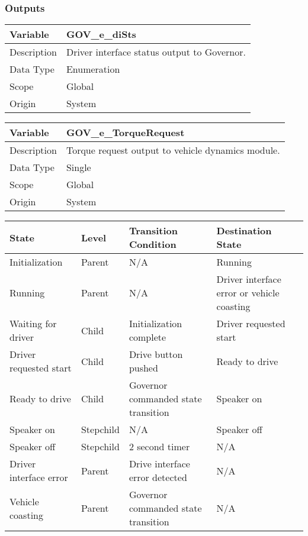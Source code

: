 \documentclass[12pt, titlepage]{article}
\newcommand{\tableVspace}{5mm}
\newcommand{\ReqColA}{0.13\textwidth}
\newcommand{\ReqColB}{0.82\textwidth}
\begin{document}
\subsubsection{Outputs}

\vspace{\tableVspace}\noindent
\begin{tabular}{| p{\ReqColA} | p{\ReqColB}|}
\hline
\rowcolor[gray]{0.9}
\hline
Variable & GOV\_e\_diSts \\
\hline
Description & Driver interface status output to Governor.\\
\hline
Data Type & Enumeration\\
\hline
Scope & Global \\
\hline
Origin & System \\
\hline
\end{tabular}

\vspace{\tableVspace}\noindent
\begin{tabular}{| p{\ReqColA} | p{\ReqColB}|}
\hline
\rowcolor[gray]{0.9}
\hline
Variable & GOV\_e\_TorqueRequest \\
\hline
Description & Torque request output to vehicle dynamics module.\\
\hline
Data Type & Single\\
\hline
Scope & Global \\
\hline
Origin & System \\
\hline
\end{tabular}

\vspace{\tableVspace}\noindent
\begin{tabular}{| p{} | p{} | p{} | p{} | }
\hline
\rowcolor[gray]{0.9}
\hline
State & Level & Transition Condition & Destination State \\
\hline
Initialization & Parent & N/A & Running\\
\hline
Running & Parent & N/A & Driver interface error or vehicle coasting\\
\hline
Waiting for driver & Child & Initialization complete & Driver requested start\\
\hline
Driver requested start & Child & Drive button pushed & Ready to drive\\
\hline
Ready to drive & Child & Governor commanded state transition & Speaker on\\
\hline
Speaker on & Stepchild & N/A & Speaker off\\
\hline
Speaker off & Stepchild & 2 second timer & N/A\\
\hline
Driver interface error & Parent & Drive interface error detected & N/A\\
\hline
Vehicle coasting & Parent & Governor commanded state transition & N/A\\
\hline
\end{tabular}
\end{document}
